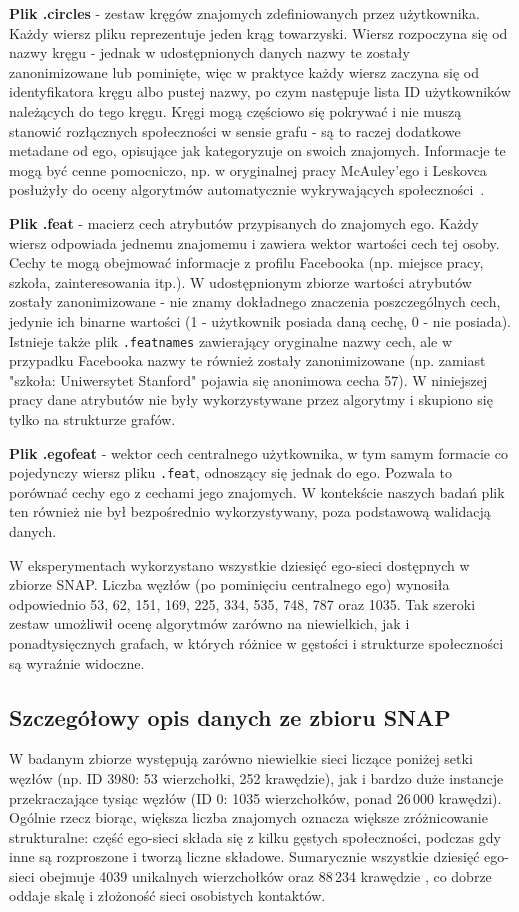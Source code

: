 \textbf{Plik .circles} - zestaw kręgów znajomych zdefiniowanych przez użytkownika. Każdy wiersz pliku reprezentuje jeden krąg towarzyski. Wiersz rozpoczyna się od nazwy kręgu - jednak w udostępnionych danych nazwy te zostały zanonimizowane lub pominięte, więc w praktyce każdy wiersz zaczyna się od identyfikatora kręgu albo pustej nazwy, po czym następuje lista ID użytkowników należących do tego kręgu. Kręgi mogą częściowo się pokrywać i nie muszą stanowić rozłącznych społeczności w sensie grafu - są to raczej dodatkowe metadane od ego, opisujące jak kategoryzuje on swoich znajomych. Informacje te mogą być cenne pomocniczo, np. w oryginalnej pracy McAuley'ego i Leskovca posłużyły do oceny algorytmów automatycznie wykrywających społeczności~\cite{McAuley2012}.

\textbf{Plik .feat} - macierz cech atrybutów przypisanych do znajomych ego. Każdy wiersz odpowiada jednemu znajomemu i zawiera wektor wartości cech tej osoby. Cechy te mogą obejmować informacje z profilu Facebooka (np. miejsce pracy, szkoła, zainteresowania itp.). W udostępnionym zbiorze wartości atrybutów zostały zanonimizowane - nie znamy dokładnego znaczenia poszczególnych cech, jedynie ich binarne wartości (1 - użytkownik posiada daną cechę, 0 - nie posiada). Istnieje także plik \verb|.featnames| zawierający oryginalne nazwy cech, ale w przypadku Facebooka nazwy te również zostały zanonimizowane (np. zamiast "szkoła: Uniwersytet Stanford" pojawia się anonimowa cecha 57). W niniejszej pracy dane atrybutów nie były wykorzystywane przez algorytmy i skupiono się tylko na strukturze grafów.

\textbf{Plik .egofeat} - wektor cech centralnego użytkownika, w tym samym formacie co pojedynczy wiersz pliku \verb|.feat|, odnoszący się jednak do ego. Pozwala to porównać cechy ego z cechami jego znajomych. W kontekście naszych badań plik ten również nie był bezpośrednio wykorzystywany, poza podstawową walidacją danych.

W eksperymentach wykorzystano wszystkie dziesięć ego-sieci dostępnych w zbiorze SNAP. Liczba węzłów (po pominięciu centralnego ego) wynosiła odpowiednio 53, 62, 151, 169, 225, 334, 535, 748, 787 oraz 1035. Tak szeroki zestaw umożliwił ocenę algorytmów zarówno na niewielkich, jak i ponadtysięcznych grafach, w których różnice w gęstości i strukturze społeczności są wyraźnie widoczne.

\subsection{Szczegółowy opis danych ze zbioru SNAP}
W badanym zbiorze występują zarówno niewielkie sieci liczące poniżej setki węzłów (np. ID 3980: 53 wierzchołki, 252 krawędzie), jak i bardzo duże instancje przekraczające tysiąc węzłów (ID 0: 1035 wierzchołków, ponad 26\,000 krawędzi). Ogólnie rzecz biorąc, większa liczba znajomych oznacza większe zróżnicowanie strukturalne: część ego-sieci składa się z kilku gęstych społeczności, podczas gdy inne są rozproszone i tworzą liczne składowe. Sumarycznie wszystkie dziesięć ego-sieci obejmuje 4039 unikalnych wierzchołków oraz 88\,234 krawędzie \cite{McAuley2012}, co dobrze oddaje skalę i złożoność sieci osobistych kontaktów.

